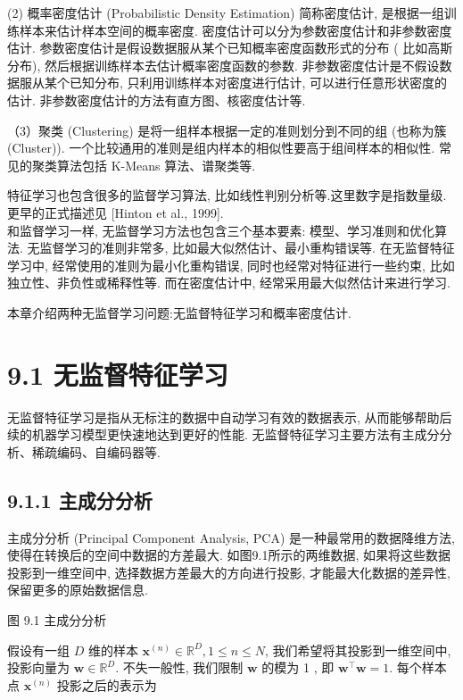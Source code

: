 \documentclass[10pt]{article}
\begin{document}
(2) 概率密度估计 (Probabilistic Density Estimation) 简称密度估计, 是根据一组训练样本来估计样本空间的概率密度. 密度估计可以分为参数密度估计和非参数密度估计. 参数密度估计是假设数据服从某个已知概率密度函数形式的分布 ( 比如高斯分布), 然后根据训练样本去估计概率密度函数的参数. 非参数密度估计是不假设数据服从某个已知分布, 只利用训练样本对密度进行估计, 可以进行任意形状密度的估计. 非参数密度估计的方法有直方图、核密度估计等.

（3）聚类 (Clustering) 是将一组样本根据一定的准则划分到不同的组 (也称为簇 (Cluster)). 一个比较通用的准则是组内样本的相似性要高于组间样本的相似性. 常见的聚类算法包括 K-Means 算法、谱聚类等.

特征学习也包含很多的监督学习算法, 比如线性判别分析等.这里数字是指数量级. 更早的正式描述见 [Hinton et al., 1999].\\
和监督学习一样, 无监督学习方法也包含三个基本要素: 模型、学习准则和优化算法. 无监督学习的准则非常多, 比如最大似然估计、最小重构错误等. 在无监督特征学习中, 经常使用的准则为最小化重构错误, 同时也经常对特征进行一些约束, 比如独立性、非负性或稀释性等. 而在密度估计中, 经常采用最大似然估计来进行学习.

本章介绍两种无监督学习问题:无监督特征学习和概率密度估计.

\section*{9.1 无监督特征学习}
无监督特征学习是指从无标注的数据中自动学习有效的数据表示, 从而能够帮助后续的机器学习模型更快速地达到更好的性能. 无监督特征学习主要方法有主成分分析、稀疏编码、自编码器等.

\subsection*{9.1.1 主成分分析}
主成分分析 (Principal Component Analysis, PCA) 是一种最常用的数据降维方法, 使得在转换后的空间中数据的方差最大. 如图9.1所示的两维数据, 如果将这些数据投影到一维空间中, 选择数据方差最大的方向进行投影, 才能最大化数据的差异性,保留更多的原始数据信息.



图 9.1 主成分分析

假设有一组 $D$ 维的样本 $\boldsymbol{x}^{(n)} \in \mathbb{R}^{D}, 1 \leq n \leq N$, 我们希望将其投影到一维空间中, 投影向量为 $\boldsymbol{w} \in \mathbb{R}^{D}$. 不失一般性, 我们限制 $\boldsymbol{w}$ 的模为 1 , 即 $\boldsymbol{w}^{\top} \boldsymbol{w}=1$. 每个样本点 $\boldsymbol{x}^{(n)}$ 投影之后的表示为
\end{document}
